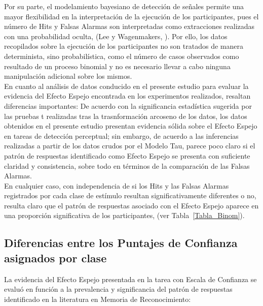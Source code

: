 Por su parte, el modelamiento bayesiano de detección de señales permite una mayor flexibilidad en la interpretación de la ejecución de los participantes, pues el número de Hits y Falsas Alarmas son interpretadas como extracciones realizadas con una probabilidad oculta, (Lee y Wagenmakers, \citeyear{LeeBook}). Por ello, los datos recopilados sobre la ejecución de los participantes no son tratados de manera determinista, sino probabilística, como el número de casos observados como resultado de un proceso binomial y no es necesario llevar a cabo ninguna manipulación adicional sobre los mismos.\\

En cuanto al análisis de datos conducido en el presente estudio para evaluar la evidencia del Efecto Espejo encontrada en los experimentos realizados, resaltan diferencias importantes: De acuerdo con la significancia estadística sugerida por las pruebas t realizadas tras la trasnformación arcoseno de los datos, los datos obtenidos en el presente estudio presentan evidencia sólida sobre el Efecto Espejo en tareas de detección perceptual; sin embargo, de acuerdo a las inferencias realizadas a partir de los datos crudos por el Modelo Tau, parece poco claro si el patrón de respuestas identificado como Efecto Espejo se presenta con suficiente claridad y consistencia, sobre todo en términos de la comparación de las Falsas Alarmas.\\

En cualquier caso, con independencia de si los Hits y las Falsas Alarmas registrados por cada clase de estímulo resultan significativamente diferentes o no, resulta claro que el patrón de respuestas asociado con el Efecto Espejo aparece en una proporción significativa de los participantes, (ver Tabla~\ref{Tabla_Binom}).\\ 















\subsection{Diferencias entre los Puntajes de Confianza asignados por clase}

La evidencia del Efecto Espejo presentada en la tarea con Escala de Confianza se evaluó en función a la prevalencia y significancia del patrón de respuestas identificado en la literatura en Memoria de Reconocimiento:\\
 
